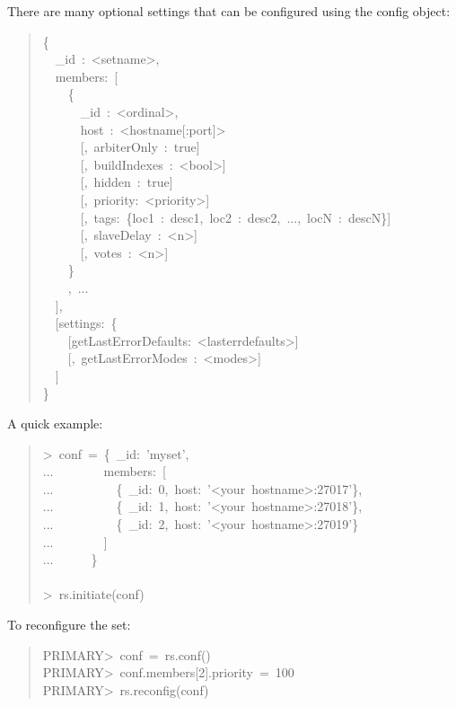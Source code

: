 \documentclass[letter]{article}
\begin{document}
There are many optional settings that can be configured using the config
object:
%
\begin{quote}{\ttfamily \raggedright \noindent
\{\\
~~\_id~:~<setname>,\\
~~members:~{[}\\
~~~~\{\\
~~~~~~\_id~:~<ordinal>,\\
~~~~~~host~:~<hostname{[}:port{]}>\\
~~~~~~{[},~arbiterOnly~:~true{]}\\
~~~~~~{[},~buildIndexes~:~<bool>{]}\\
~~~~~~{[},~hidden~:~true{]}\\
~~~~~~{[},~priority:~<priority>{]}\\
~~~~~~{[},~tags:~\{loc1~:~desc1,~loc2~:~desc2,~...,~locN~:~descN\}{]}\\
~~~~~~{[},~slaveDelay~:~<n>{]}\\
~~~~~~{[},~votes~:~<n>{]}\\
~~~~\}\\
~~~~,~...\\
~~{]},\\
~~{[}settings:~\{\\
~~~~{[}getLastErrorDefaults:~<lasterrdefaults>{]}\\
~~~~{[},~getLastErrorModes~:~<modes>{]}\\
~~{]}\\
\}
}
\end{quote}

A quick example:
%
\begin{quote}{\ttfamily \raggedright \noindent
>~conf~=~\{~\_id:~'myset',\\
...~~~~~~~~members:~{[}\\
...~~~~~~~~~~\{~\_id:~0,~host:~'<your~hostname>:27017'\},\\
...~~~~~~~~~~\{~\_id:~1,~host:~'<your~hostname>:27018'\},\\
...~~~~~~~~~~\{~\_id:~2,~host:~'<your~hostname>:27019'\}\\
...~~~~~~~~{]}\\
...~~~~~~\}\\
~\\
>~rs.initiate(conf)
}
\end{quote}

To reconfigure the set:
%
\begin{quote}{\ttfamily \raggedright \noindent
PRIMARY>~conf~=~rs.conf()\\
PRIMARY>~conf.members{[}2{]}.priority~=~100\\
PRIMARY>~rs.reconfig(conf)
}
\end{quote}
\end{document}
